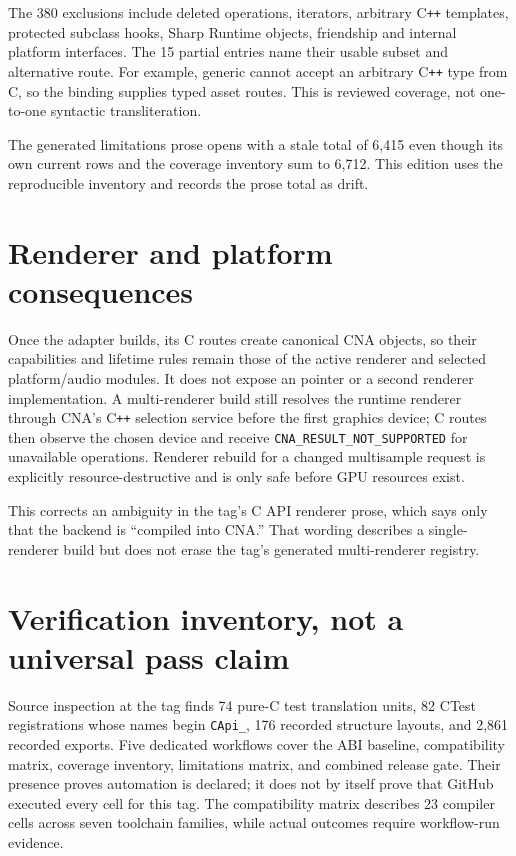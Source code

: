 The 380 exclusions include deleted operations, iterators, arbitrary C\texttt{++} templates,
protected subclass hooks, Sharp Runtime objects, friendship and internal platform interfaces.
The 15 partial entries name their usable subset and alternative route. For example, generic
 cannot accept an arbitrary C\texttt{++} type from C, so the binding
supplies typed asset routes. This is reviewed coverage, not one-to-one syntactic transliteration.

The generated limitations prose opens with a stale total of 6,415 even though its own current
rows and the coverage inventory sum to 6,712. This edition uses the reproducible inventory and
records the prose total as drift.

\section{Renderer and platform consequences}

Once the adapter builds, its C routes create canonical CNA objects, so their capabilities and
lifetime rules remain those of the active renderer and selected platform/audio modules. It does not expose an
 pointer or a second renderer implementation. A multi-renderer build
still resolves the runtime renderer through CNA's C\texttt{++} selection service before the first
graphics device; C routes then observe the chosen device and receive
\texttt{CNA\_RESULT\_NOT\_SUPPORTED} for unavailable operations. Renderer rebuild for a changed
multisample request is explicitly resource-destructive and is only safe before GPU resources
exist.

This corrects an ambiguity in the tag's C API renderer prose, which says only that the backend is
``compiled into CNA.'' That wording describes a single-renderer build but does not erase the
tag's generated multi-renderer registry.

\section{Verification inventory, not a universal pass claim}

Source inspection at the tag finds 74 pure-C test translation units, 82 CTest registrations whose
names begin \texttt{CApi\_}, 176 recorded structure layouts, and 2,861 recorded exports. Five
dedicated workflows cover the ABI baseline, compatibility matrix, coverage inventory,
limitations matrix, and combined release gate. Their presence proves automation is declared;
it does not by itself prove that GitHub executed every cell for this tag. The compatibility
matrix describes 23 compiler cells across seven toolchain families, while actual outcomes require
workflow-run evidence.

